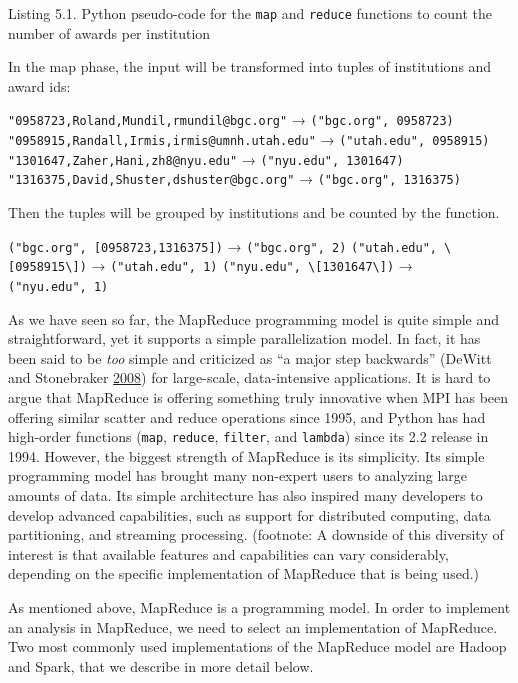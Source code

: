 \documentclass[]{krantz}
\begin{document}
Listing 5.1. Python pseudo-code for the \texttt{map} and \texttt{reduce}
functions to count the number of awards per institution

In the map phase, the input will be transformed into tuples of
institutions and award ids:

\texttt{"0958723,Roland,Mundil,rmundil@bgc.org"} →
\texttt{("bgc.org",\ 0958723)}
\texttt{"0958915,Randall,Irmis,irmis@umnh.utah.edu"} →
\texttt{("utah.edu",\ 0958915)}
\texttt{"1301647,Zaher,Hani,zh8@nyu.edu"} →
\texttt{("nyu.edu",\ 1301647)}
\texttt{"1316375,David,Shuster,dshuster@bgc.org"} →
\texttt{("bgc.org",\ 1316375)}

Then the tuples will be grouped by institutions and be counted by the
function.

\texttt{("bgc.org",\ {[}0958723,1316375{]})} → \texttt{("bgc.org",\ 2)}
\texttt{("utah.edu",\ \textbackslash{}{[}0958915\textbackslash{}{]})} →
\texttt{("utah.edu",\ 1)}
\texttt{("nyu.edu",\ \textbackslash{}{[}1301647\textbackslash{}{]})} →
\texttt{("nyu.edu",\ 1)}

As we have seen so far, the MapReduce programming model is quite simple
and straightforward, yet it supports a simple parallelization model. In
fact, it has been said to be \emph{too} simple and criticized as ``a
major step backwards'' (DeWitt and Stonebraker
\protect\hyperlink{ref-MapReduceBad}{2008}) for large-scale,
data-intensive applications. It is hard to argue that MapReduce is
offering something truly innovative when MPI has been offering similar
scatter and reduce operations since 1995, and Python has had high-order
functions (\texttt{map}, \texttt{reduce}, \texttt{filter}, and
\texttt{lambda}) since its 2.2 release in 1994. However, the biggest
strength of MapReduce is its simplicity. Its simple programming model
has brought many non-expert users to analyzing large amounts of data.
Its simple architecture has also inspired many developers to develop
advanced capabilities, such as support for distributed computing, data
partitioning, and streaming processing. (footnote: A downside of this
diversity of interest is that available features and capabilities can
vary considerably, depending on the specific implementation of MapReduce
that is being used.)

As mentioned above, MapReduce is a programming model. In order to
implement an analysis in MapReduce, we need to select an implementation
of MapReduce. Two most commonly used implementations of the MapReduce
model are Hadoop and Spark, that we describe in more detail below.
\end{document}

